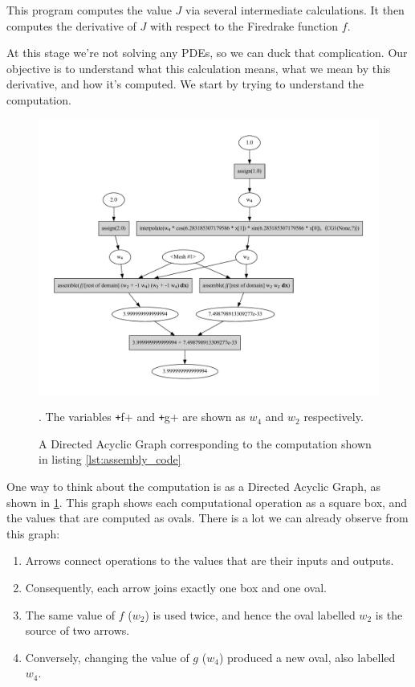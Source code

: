 \documentclass[a4paper,12pt]{report}
\begin{document}
This program computes the value $J$ via several intermediate calculations. It
then computes the derivative of $J$ with respect to the Firedrake function $f$.

At this stage we're not solving any PDEs, so we can duck that complication. Our
objective is to understand what this calculation means, what we mean by this
derivative, and how it's computed. We start by trying to understand the
computation.

\begin{figure}
    \includegraphics*[width=\textwidth]{examples/assembly.pdf}
    \caption{A Directed Acyclic Graph corresponding to the computation shown in
    listing \ref{lst:assembly_code}}. The variables \texttt+f+ and
    \texttt+g+ are shown as $w_4$ and $w_2$ respectively.
    \label{fig:assembly_dag}
\end{figure}

One way to think about the computation is as a Directed Acyclic Graph, as shown
in \ref{fig:assembly_dag}. This graph shows each computational operation as a
square box, and the values that are computed as ovals. There is a lot we can
already observe from this graph:

\begin{enumerate}
    \item Arrows connect operations to the values that are their inputs and
    outputs.
    \item Consequently, each arrow joins exactly one box and one oval.
    \item The same value of $f$ ($w_2$) is used twice, and hence the oval
    labelled $w_2$ is the source of two arrows.
    \item Conversely, changing the value of $g$ ($w_4$) produced a new oval,
    also labelled $w_4$.
\end{enumerate}
\end{document}
